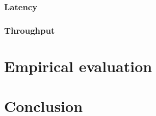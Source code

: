 \documentclass[a4paper]{article}
\begin{document}
\subsubsection*{Latency}

\subsubsection*{Throughput}

\section*{Empirical evaluation}

\section*{Conclusion}
\end{document}
